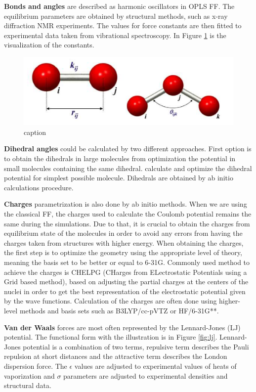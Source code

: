 \textbf{Bonds and angles} are described as harmonic oscillators in OPLS FF. The equilibrium parameters are obtained by structural methods, such as x-ray diffraction NMR experiments. The values for force constants are then fitted to experimental data taken from vibrational spectroscopy. In Figure \ref{fig:bond} is the visualization of the constants.

\begin{figure}[htb!]
	\centering
	\includegraphics[width=1.0\linewidth]{img/bond_angles.png} 
	\caption{caption}
	\label{fig:bond}    
\end{figure}   

\textbf{Dihedral angles} could be calculated by two different approaches. First option is to obtain the dihedrals in large molecules from optimization the potential in small molecules containing the same dihedral. calculate and optimize the dihedral potential for simplest possible molecule. Dihedrals are obtained by ab initio calculations procedure. 

\textbf{Charges} parametrization is also done by ab initio methods. When we are using the classical FF, the charges used to calculate the Coulomb potential remains the same during the simulations. Due to that, it is crucial to obtain the charges from equilibrium state of the molecules in order to avoid any errors from having the charges taken from structures with higher energy. When obtaining the charges, the first step is to optimize the geometry using the appropriate level of theory, meaning the basis set to be better or equal to 6-31G. Commonly used method to achieve the charges is CHELPG (CHarges from ELectrostatic Potentials using a Grid based method), based on adjusting the partial charges at the centers of the nuclei in order to get the best representation of the electrostatic potential given by the wave functions. Calculation of the charges are often done using higher-level methods and basis sets such as B3LYP/cc-pVTZ or HF/6-31G**.

\textbf{Van der Waals} forces are most often represented by the Lennard-Jones (LJ) potential. The functional form with the illustration is in Figure \ref{fig:lj}. Lennard-Jones potential is a combination of two terms, repulsive term describes the Pauli repulsion at short distances and the attractive term describes the London dispersion force. The $\epsilon$ values are adjusted to experimental values of heats of vaporization and $\sigma$ parameters are adjusted to experimental densities and structural data.


